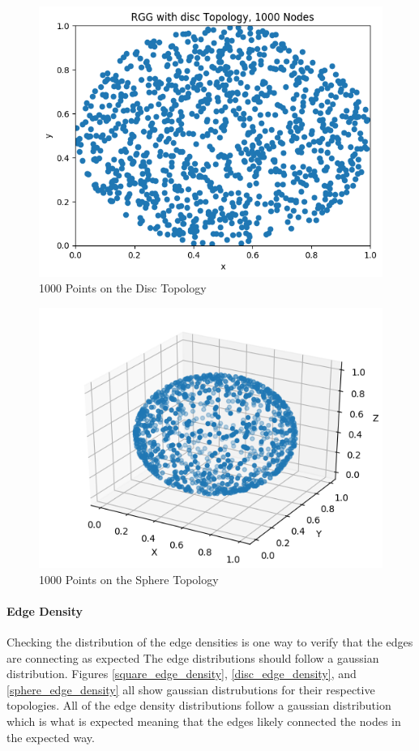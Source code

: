 \documentclass{article}
\begin{document}
    \begin{figure}[H]
      \label{drawing_of_disc}
      \includegraphics[width=1 \textwidth]{disc/drawing/nodes.png}
      \caption{1000 Points on the Disc Topology}
    \end{figure}
    \begin{figure}[H]
      \label{drawing_of_sphere}
      \includegraphics[width=1 \textwidth]{sphere/drawing/sphere_drawing.png}
      \caption{1000 Points on the Sphere Topology}
    \end{figure}

    \paragraph{Edge Density}
    Checking the distribution of the edge densities is one way to verify that the edges are connecting as expected
    The edge distributions should follow a gaussian distribution.
    Figures \ref{square_edge_density}, \ref{disc_edge_density}, and \ref{sphere_edge_density} all show gaussian distrubutions for their respective topologies.
    All of the edge density distributions follow a gaussian distribution which is what is expected meaning that the edges likely connected the nodes in the expected way.
\end{document}
